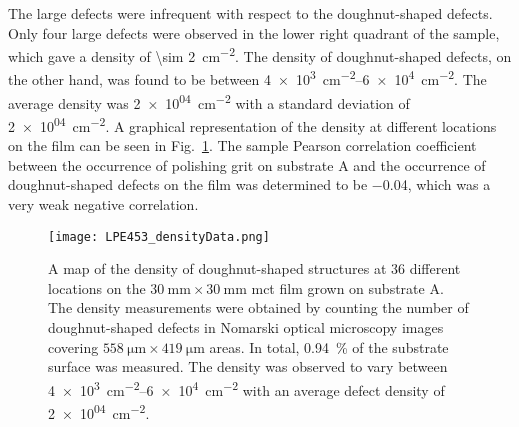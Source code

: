 The large defects were infrequent with respect to the doughnut-shaped defects. Only four large defects were observed in the lower right quadrant of the sample, which gave a density of \SI{\sim 2}{\centi\metre^{-2}}. The density of doughnut-shaped defects, on the other hand, was found to be between \SIrange{4e+3}{6e+4}{\centi\metre^{-2}}. The average density was \SI{2e+04}{\centi\metre^{-2}} with a standard deviation of \SI{2e+04}{\centi\metre^{-2}}. A graphical representation of the density at different locations on the film can be seen in Fig.~\ref{fig:LPE453_densityData}. The sample Pearson correlation coefficient between the occurrence of polishing grit on substrate A and the occurrence of doughnut-shaped defects on the film was determined to be \SI{-0.04}{}, which was a very weak negative correlation.

\begin{figure}[htbp]
    \centering
    \texttt{[image: LPE453\_densityData.png]}
    \caption[Map of the density of doughnut-shaped structures on the \ac{mct} film grown on substrate A.]{A map of the density of doughnut-shaped structures at 36 different locations on the $\SI{30}{\milli\metre}\times\SI{30}{\milli\metre}$ \ac{mct} film grown on substrate A. The density measurements were obtained by counting the number of doughnut-shaped defects in Nomarski optical microscopy images covering $\SI{558}{\micro\metre}\times\SI{419}{\micro\metre}$ areas. In total, \SI{0.94}{\percent} of the substrate surface was measured. The density was observed to vary between \SIrange{4e+3}{6e+4}{\centi\metre^{-2}} with an average defect density of \SI{2e+04}{\centi\metre^{-2}}.}
    \label{fig:LPE453_densityData}
\end{figure}




